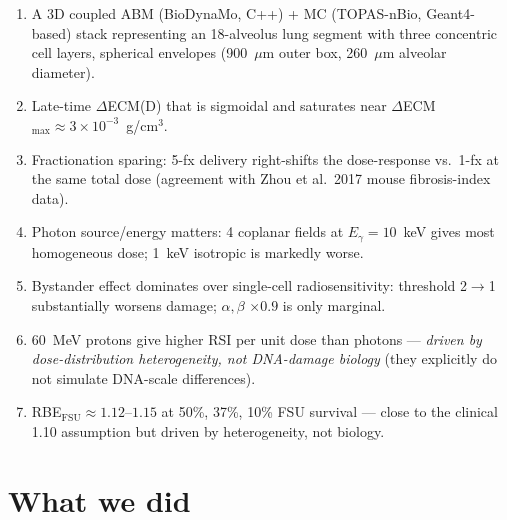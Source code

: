 \documentclass[11pt]{article}
\begin{document}
\begin{enumerate}
  \item A 3D coupled ABM (BioDynaMo, C++) + MC (TOPAS-nBio, Geant4-based)
        stack representing an 18-alveolus lung segment with three concentric
        cell layers, spherical envelopes (900~$\mu$m outer box, 260~$\mu$m
        alveolar diameter).
  \item Late-time $\Delta$ECM(D) that is sigmoidal and saturates near
        $\Delta$ECM$_{\max} \approx 3\times 10^{-3}$~g/cm$^3$.
  \item Fractionation sparing: 5-fx delivery right-shifts the dose-response
        vs.\ 1-fx at the same total dose (agreement with Zhou et al.\ 2017
        mouse fibrosis-index data).
  \item Photon source/energy matters: 4 coplanar fields at $E_\gamma = 10$~keV
        gives most homogeneous dose; 1~keV isotropic is markedly worse.
  \item Bystander effect dominates over single-cell radiosensitivity:
        threshold 2$\rightarrow$1 substantially worsens damage; $\alpha,\beta$
        $\times 0.9$ is only marginal.
  \item 60~MeV protons give higher RSI per unit dose than photons ---
        \emph{driven by dose-distribution heterogeneity, not DNA-damage
        biology} (they explicitly do not simulate DNA-scale differences).
  \item RBE$_{\mathrm{FSU}} \approx 1.12$--$1.15$ at 50\%, 37\%, 10\% FSU
        survival --- close to the clinical 1.10 assumption but driven by
        heterogeneity, not biology.
\end{enumerate}

\section{What we did}
\end{document}
